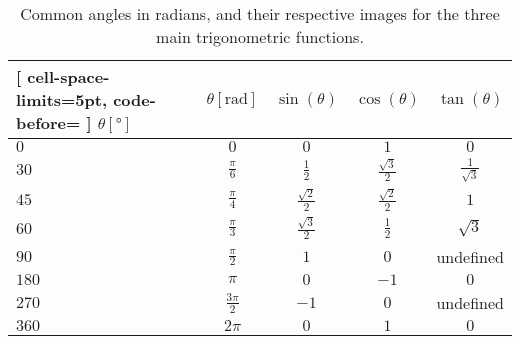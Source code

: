 \begin{table}
	\caption{Common angles in radians, and their respective images for the three main trigonometric functions.}
	\label{tab:rad_degs}
	\centering
	\begin{NiceTabular}{lcccc}[
			cell-space-limits=5pt, code-before= 
		]
		\toprule
		$\theta [\si{\degree}]$ & $\theta[\si{\radian}]$ & $\sin(\theta)$ & $\cos(\theta)$ & $\tan(\theta)$ \\
		\midrule
		\RowStyle[bold=true]{} $0$   & $0$								 & $0$									& $1$									 & $0$\\
		$30$  & $\frac{\pi}{6}$	 & $\frac{1}{2}$				& $\frac{\sqrt{3}}{2}$ & $\frac{1}{\sqrt{3}}$\\
		$45$  & $\frac{\pi}{4}$  & $\frac{\sqrt{2}}{2}$ & $\frac{\sqrt{2}}{2}$ & $1$\\
		$60$  & $\frac{\pi}{3}$  & $\frac{\sqrt{3}}{2}$ & $\frac{1}{2}$				 & $\sqrt{3}$\\
		$90$  & $\frac{\pi}{2}$  & $1$									& $0$									 & undefined\\
		$180$ & $\pi$						 & $0$									& $-1$								 & $0$\\
		$270$ & $\frac{3\pi}{2}$ & $-1$									& $0$									 & undefined\\
		$360$ & $2\pi$					 & $0$									& $1$ 								 & $0$\\
		\bottomrule
	\end{NiceTabular}
\end{table}


